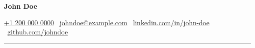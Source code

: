 {\Huge\bfseries John Doe}

\vspace{2\vspaceDefault}

\href{tel:+12000000000}{+1 200 000 0000} \textbullet\
\href{mailto:johndoe@example.com}{johndoe@example.com} \textbullet\
\href{https://linkedin.com/in/john-doe}{linkedin.com/in/john-doe} \textbullet\
\href{https://github.com/johndoe}{github.com/johndoe}

\vspace{\vspaceDefault}

\hrule
